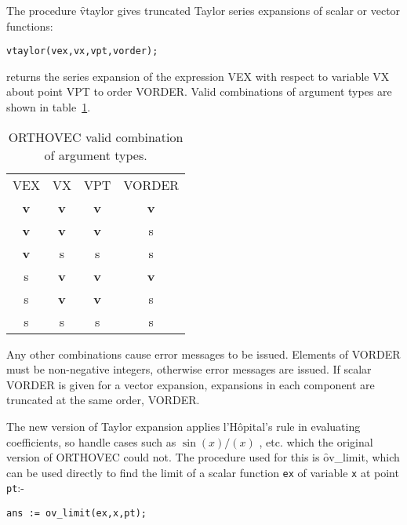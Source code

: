 The procedure \f{vtaylor} gives truncated Taylor series expansions of scalar
or vector functions: 
\hypertarget{operator:VTAYLOR}{}
\begin{verbatim}
vtaylor(vex,vx,vpt,vorder);
\end{verbatim}
returns the series expansion of the expression 
VEX  with respect to variable VX 
about point VPT  to order VORDER.  Valid
combinations of argument types are shown in table~\ref{ORTHOVEC:validexp}.

\begin{table}
\begin{center}
\begin{tabular}{cccc}
VEX & VX & VPT &  VORDER \\[2ex]
\textbf{v} & \textbf{v} &  \textbf{v} &  \textbf{v}\\
\textbf{v} &  \textbf{v} & \textbf{v} & s\\
\textbf{v} & s & s & s \\
s & \textbf{v} &  \textbf{v} & \textbf{v}   \\
s & \textbf{v} & \textbf{v} & s\\
s & s & s & s\\
\end{tabular}
\end{center}
\caption{\textsc{ORTHOVEC} valid combination of argument types.}\label{ORTHOVEC:validexp}
\end{table}

Any other combinations cause error messages to be issued.  Elements of
VORDER must be non-negative integers, otherwise error messages are
issued.  If scalar VORDER is given for a vector expansion, expansions
in each component are truncated at the same order, VORDER.

\hypertarget{operator:OV_LIMIT}{}
The new version of Taylor expansion applies 
l'H\^opital's rule in evaluating coefficients, so handle cases such as
$\sin(x) / (x) $ , etc.  which the original version of \textsc{ORTHOVEC} could
not. The procedure used for this is \f{ov\_limit},  which can
be used directly to find the limit of a scalar function \texttt{ex} of
variable \texttt{x} at point \texttt{pt}:-

\begin{verbatim}
ans := ov_limit(ex,x,pt);
\end{verbatim}

